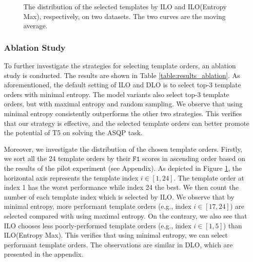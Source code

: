 \documentclass[11pt]{article}
\begin{document}
\begin{figure}[t]
\centering
{}
\caption{The distribution of the selected templates by ILO and ILO(Entropy Max), respectively, on two datasets. The two curves are the moving average.}
\label{fig:figure_template_scale}
\end{figure}


\subsubsection{Ablation Study}
To further investigate the strategies for selecting template orders, an ablation study is conducted. The results are shown in Table \ref{table:results_ablation}. As aforementioned, the default setting of ILO and DLO is to select top-3  template orders with minimal entropy. The model variants also select top-3 template orders, but with maximal entropy and random sampling. We observe that using minimal entropy consistently outperforms the other two strategies. This verifies that our strategy is effective, and the selected template orders can better promote the potential of T5 on solving the ASQP task.







Moreover, we investigate the distribution of the chosen template orders. Firstly, we sort all the 24 template orders by their $\mathtt{F1}$ scores in ascending order based on the results of the pilot experiment (see Appendix). As depicted in Figure \ref{fig:figure_template_scale}, the horizontal axis represents the template index $i\in{[1,24]}$. The template order at index 1 has the worst performance while index 24 the best. We then count the number of each template index which is selected by ILO. We observe that by minimal entropy, more performant template orders (e.g., index $i\in[17,24]$) are selected compared with using maximal entropy. On the contrary, we also see that ILO chooses less poorly-performed template orders (e.g., index $i\in[1,5]$) than ILO(Entropy Max). This verifies that using minimal entropy, we can select performant template orders. The observations are similar in DLO, which are presented in the appendix.
\end{document}
